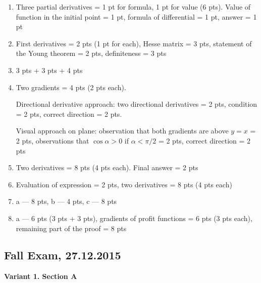 \documentclass[12pt]{article} %
\theoremstyle{definition} %
\begin{document}
\begin{enumerate}
\item Three partial derivatives = 1 pt for formula, 1 pt for value (6 pts). Value of function in the initial point = 1 pt, formula of differential = 1 pt, answer = 1 pt
\item First derivatives =  2 pts (1 pt for each), Hesse matrix = 3 pts, statement of the Young theorem = 2 pts, definiteness = 3 pts
\item 3 pts + 3 pts + 4 pts
\item Two gradients = 4 pts (2 pts each).

Directional derivative approach: two directional derivatives = 2 pts, condition = 2 pts, correct direction = 2 pts.

Visual approach on plane: observation that both gradients are above $y=x$ = 2 pts, observations that $\cos \alpha >0 $ if $\alpha < \pi/2$ = 2 pts, correct direction = 2 pts

\item Two derivatives = 8 pts (4 pts each). Final answer = 2 pts
\item Evaluation of expression = 2 pts, two derivatives = 8 pts (4 pts each)
\item a --- 8 pts, b --- 4 pts, c --- 8 pts
\item a --- 6 pts (3 pts + 3 pts), gradients of profit functions = 6 pts (3 pts each), remaining part of the proof = 8 pts
\end{enumerate}


\subsection{Fall Exam, 27.12.2015}

\textbf{Variant 1. Section A}
\end{document}
